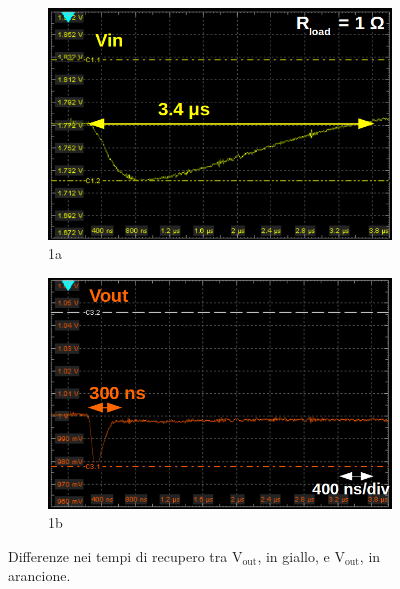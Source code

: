 \begin{figure}
\begin{subfigure}{.5\textwidth}
  \centering
  \includegraphics[width=.95\linewidth]{Immagini/zoomDipendenzaVoutdaVin1}
  \caption{1a}
  \label{DipVoutVin:sfig1}
\end{subfigure}%
\begin{subfigure}{.5\textwidth}
  \centering
  \includegraphics[width=.95\linewidth]{Immagini/zoomDipendenzaVoutdaVin2}
  \caption{1b}
  \label{DipVoutVin:sfig2}
\end{subfigure}
\caption{Differenze nei tempi di recupero tra $\mathrm{V_{out}}$, in giallo, e $\mathrm{V_{out}}$, in arancione.}
\label{DipVoutVin}
\end{figure}

